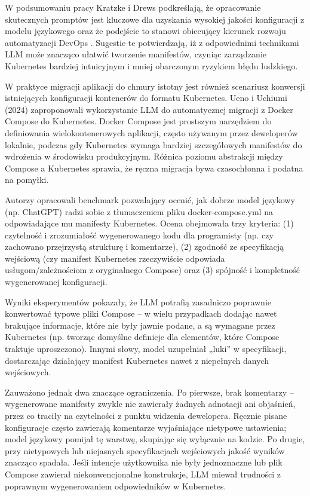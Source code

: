 W podsumowaniu pracy Kratzke i Drews podkreślają, że opracowanie skutecznych promptów jest kluczowe dla uzyskania wysokiej jakości konfiguracji z modelu językowego oraz że podejście to stanowi obiecujący kierunek rozwoju automatyzacji DevOps \cite{kratzke_dont_2024}. Sugestie te potwierdzają, iż z odpowiednimi technikami LLM może znacząco ułatwić tworzenie manifestów, czyniąc zarządzanie Kubernetes bardziej intuicyjnym i mniej obarczonym ryzykiem błędu ludzkiego.

W praktyce migracji aplikacji do chmury istotny jest również scenariusz konwersji istniejących konfiguracji kontenerów do formatu Kubernetes. Ueno i Uchiumi (2024) zaproponowali wykorzystanie LLM do automatycznej migracji z Docker Compose do Kubernetes. Docker Compose jest prostszym narzędziem do definiowania wielokontenerowych aplikacji, często używanym przez deweloperów lokalnie, podczas gdy Kubernetes wymaga bardziej szczegółowych manifestów do wdrożenia w środowisku produkcyjnym. Różnica poziomu abstrakcji między Compose a Kubernetes sprawia, że ręczna migracja bywa czasochłonna i podatna na pomyłki.

Autorzy opracowali benchmark pozwalający ocenić, jak dobrze model językowy (np. ChatGPT) radzi sobie z tłumaczeniem pliku docker-compose.yml na odpowiadające mu manifesty Kubernetes. Ocena obejmowała trzy kryteria: (1) czytelność i zrozumiałość wygenerowanego kodu dla programisty (np. czy zachowano przejrzystą strukturę i komentarze), (2) zgodność ze specyfikacją wejściową (czy manifest Kubernetes rzeczywiście odpowiada usługom/zależnościom z oryginalnego Compose) oraz (3) spójność i kompletność wygenerowanej konfiguracji.

Wyniki eksperymentów pokazały, że LLM potrafią zasadniczo poprawnie konwertować typowe pliki Compose – w wielu przypadkach dodając nawet brakujące informacje, które nie były jawnie podane, a są wymagane przez Kubernetes (np. tworząc domyślne definicje dla elementów, które Compose traktuje uproszczono). Innymi słowy, model uzupełniał „luki” w specyfikacji, dostarczając działający manifest Kubernetes nawet z niepełnych danych wejściowych.

Zauważono jednak dwa znaczące ograniczenia. Po pierwsze, brak komentarzy – wygenerowane manifesty zwykle nie zawierały żadnych adnotacji ani objaśnień, przez co traciły na czytelności z punktu widzenia dewelopera. Ręcznie pisane konfiguracje często zawierają komentarze wyjaśniające nietypowe ustawienia; model językowy pomijał tę warstwę, skupiając się wyłącznie na kodzie. Po drugie, przy nietypowych lub niejasnych specyfikacjach wejściowych jakość wyników znacząco spadała. Jeśli intencje użytkownika nie były jednoznaczne lub plik Compose zawierał niekonwencjonalne konstrukcje, LLM miewał trudności z poprawnym wygenerowaniem odpowiedników w Kubernetes.

